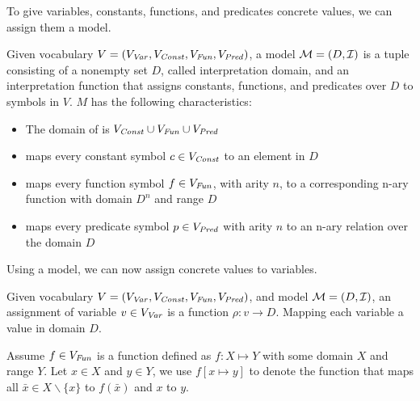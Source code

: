 To give variables, constants, functions, and predicates concrete values, we can assign them a model.
\begin{mydef}[Model]
	Given vocabulary $V = (V_{\mathit{Var}}, V_{\mathit{Const}}, V_{\mathit{Fun}}, V_{\mathit{Pred}})$, a model $\mathcal{M} = (D, \mathcal{I})$ is a tuple consisting of a nonempty set $D$, called interpretation domain, and an interpretation function \interpret that assigns constants, functions, and predicates over $D$ to symbols in $V$. $M$ has the following characteristics:
	\begin{itemize}
		\item The domain of \interpret is $V_{\mathit{Const}} \cup V_{\mathit{Fun}} \cup V_{\mathit{Pred}}$
		\item \interpret maps every constant symbol $c \in V_{\mathit{Const}}$ to an element in $D$
		\item \interpret maps every function symbol $f \in V_{\mathit{Fun}}$, with arity $n$, to a corresponding n-ary function with domain $D^n$ and range $D$
		\item \interpret maps every predicate symbol $p \in V_{\mathit{Pred}}$ with arity $n$ to an n-ary relation over the domain $D$
	\end{itemize}
\end{mydef}
Using a model, we can now assign concrete values to variables.
\begin{mydef}
	Given vocabulary $V = (V_{\mathit{Var}}, V_{\mathit{Const}}, V_{\mathit{Fun}}, V_{\mathit{Pred}})$, and model $\mathcal{M} = (D, \mathcal{I})$, an assignment of variable $v \in V_{\mathit{Var}}$ is a function $\rho: v \rightarrow D$. Mapping each variable a value in domain $D$.
\end{mydef}
Assume $f \in V_{\mathit{Fun}}$ is a function defined as $f: X \mapsto Y$ with some domain $X$ and range $Y$. Let $x \in X$ and $y \in Y$, we use $f[x \mapsto y]$  to denote the function that maps all $\bar{x} \in X \backslash \{ x \}$ to $f(\bar{x})$ and $x$ to $y$.

